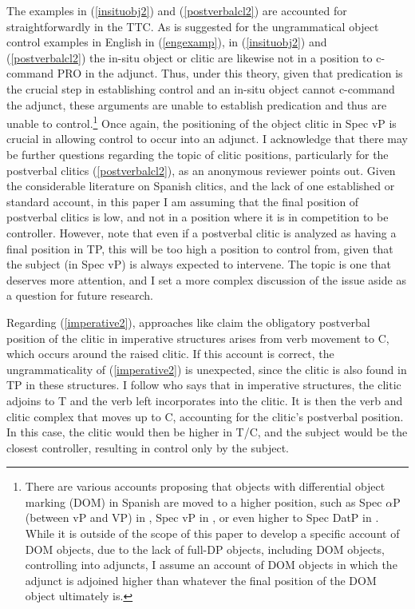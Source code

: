 \documentclass[output=paper,colorlinks,citecolor=brown]{langscibook}
\begin{document}
The examples in (\ref{insituobj2}) and (\ref{postverbalcl2}) are accounted for straightforwardly in the TTC. As is suggested for the ungrammatical object control examples in English in (\ref{engexamp}), in (\ref{insituobj2}) and (\ref{postverbalcl2}) the in-situ object or clitic are likewise not in a position to c-command PRO in the adjunct. Thus, under this theory, given that predication is the crucial step in establishing control and an in-situ object cannot c-command the adjunct, these arguments are unable to establish predication and thus are unable to control.\footnote{There are various accounts proposing that objects with differential object marking (DOM) in Spanish are moved to a higher position, such as Spec {$\alpha$}P (between vP and VP) in \citet{lopez2014derivational}, Spec vP in \citet{torrego1998dependencies}, or even higher to Spec DatP in \citet{rodriguez2007syntax}. While it is outside of the scope of this paper to develop a specific account of DOM objects, due to the lack of full-DP objects, including DOM objects, controlling into adjuncts, I assume an account of DOM objects in which the adjunct is adjoined higher than whatever the final position of the DOM object ultimately is.} Once again, the positioning of the object clitic in Spec vP is crucial in allowing control to occur into an adjunct. I acknowledge that there may be further questions regarding the topic of clitic positions, particularly for the postverbal clitics (\ref{postverbalcl2}), as an anonymous reviewer points out. Given the considerable literature on Spanish clitics, and the lack of one established or standard account, in this paper I am assuming that the final position of postverbal clitics is low, and not in a position where it is in competition to be controller. However, note that even if a postverbal clitic is analyzed as having a final position in TP, this will be too high a position to control from, given that the subject (in Spec vP) is always expected to intervene. The topic is one that deserves more attention, and I set a more complex discussion of the issue aside as a question for future research.


Regarding (\ref{imperative2}), approaches like \citet{rivero1995imperatives} claim the obligatory postverbal position of the clitic in imperative structures arises from verb movement to C, which occurs around the raised clitic. If this account is correct, the ungrammaticality of (\ref{imperative2}) is unexpected, since the clitic is also found in TP in these structures. I follow \citet{terzi1999clitic} who says that in imperative structures, the clitic adjoins to T and the verb left incorporates into the clitic. It is then the verb and clitic complex that moves up to C, accounting for the clitic’s postverbal position. In this case, the clitic would then be higher in T/C, and the subject would be the closest controller, resulting in control only by the subject.
\end{document}

